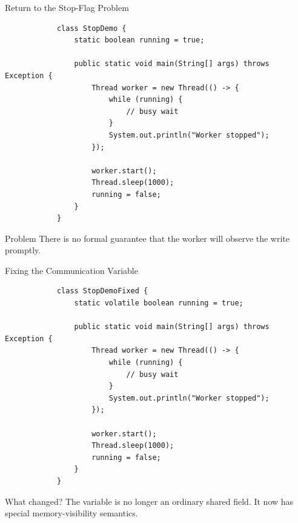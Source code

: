 \documentclass[aspectratio=169,11pt]{beamer}
\begin{document}
	\begin{frame}[fragile]{Return to the Stop-Flag Problem}
		\begin{lstlisting}
			class StopDemo {
				static boolean running = true;
				
				public static void main(String[] args) throws Exception {
					Thread worker = new Thread(() -> {
						while (running) {
							// busy wait
						}
						System.out.println("Worker stopped");
					});
					
					worker.start();
					Thread.sleep(1000);
					running = false;
				}
			}
		\end{lstlisting}
		
		\vspace{0.2cm}
		
		\begin{alertblock}{Problem}
			There is no formal guarantee that the worker will observe the write promptly.
		\end{alertblock}
	\end{frame}
	
	\begin{frame}[fragile]{Fixing the Communication Variable}
		\begin{lstlisting}
			class StopDemoFixed {
				static volatile boolean running = true;
				
				public static void main(String[] args) throws Exception {
					Thread worker = new Thread(() -> {
						while (running) {
							// busy wait
						}
						System.out.println("Worker stopped");
					});
					
					worker.start();
					Thread.sleep(1000);
					running = false;
				}
			}
		\end{lstlisting}
		
		\vspace{0.2cm}
		
		\begin{exampleblock}{What changed?}
			The variable is no longer an ordinary shared field.  
			It now has special memory-visibility semantics.
		\end{exampleblock}
	\end{frame}
	
\end{document}
